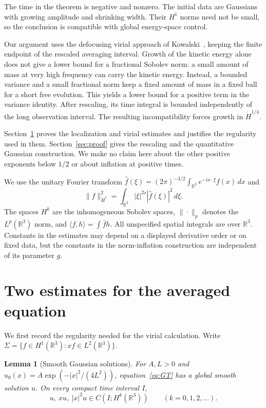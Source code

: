 \documentclass[11pt]{article}
\newcommand{\R}{\mathbb R}
\numberwithin{equation}{section}
\newtheorem{lemma}{Lemma}[section]
\begin{document}
The time in the theorem is negative and nonzero. The initial data are Gaussians
with growing amplitude and shrinking width. Their $H^1$ norms need not be
small, so the conclusion is compatible with global energy-space control.

Our argument uses the defocusing virial approach of
Kowalski~\cite[Proposition~1.5 and Section~6.1]{K}, keeping the finite endpoint
of the rescaled averaging interval. Growth of the kinetic energy alone does
not give a lower bound for a fractional Sobolev norm: a small amount of mass
at very high frequency can carry the kinetic energy. Instead, a bounded
variance and a small fractional norm keep a fixed amount of mass in a fixed
ball for a short free evolution. This yields a lower bound for a positive
term in the variance identity. After rescaling, its time integral is bounded
independently of the long observation interval. The resulting incompatibility
forces growth in $\dot H^{1/4}$.

Section~\ref{sec:estimates} proves the localization and virial estimates and
justifies the regularity used in them. Section~\ref{sec:proof} gives the
rescaling and the quantitative Gaussian construction. We make no claim here
about the other positive exponents below $1/2$ or about inflation at positive
times.

We use the unitary Fourier transform
$\widehat f(\xi)=(2\pi)^{-3/2}\int_{\R^3}e^{-ix\cdot\xi}f(x)\,dx$ and
\[
 \|f\|_{\dot H^s}^2=\int_{\R^3}|\xi|^{2s}|\widehat f(\xi)|^2\,d\xi.
\]
The spaces $H^k$ are the inhomogeneous Sobolev spaces, $\|\cdot\|_p$ denotes
the $L^p(\R^3)$ norm, and $\langle f,h\rangle=\int\bar f h$.
All unspecified spatial integrals are over $\R^3$. Constants in the estimates
may depend on a displayed derivative order or on fixed data, but the constants
in the norm-inflation construction are independent of its parameter $g$.

\section{Two estimates for the averaged equation}\label{sec:estimates}

We first record the regularity needed for the virial calculation. Write
$\Sigma=\{f\in H^1(\R^3):xf\in L^2(\R^3)\}$.

\begin{lemma}[Smooth Gaussian solutions]\label{lem:smooth}
For $A,L>0$ and $u_0(x)=A\exp(-|x|^2/(4L^2))$, equation~\eqref{eq:GT}
has a global smooth solution $u$. On every compact time interval $I$,
\[
 u,\ xu,\ |x|^2u\in C(I;H^k(\R^3))\qquad(k=0,1,2,\ldots).
\]
\end{lemma}
\end{document}
